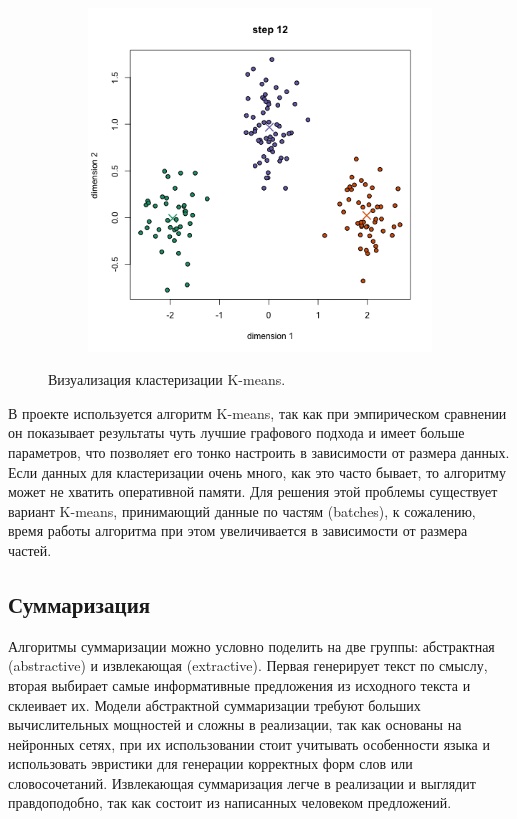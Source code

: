 \documentclass[a4paper, 14pt]{extarticle}
\begin{document}
\begin{figure}
\begin{subfigure}[b]{0.3\textwidth}
		\caption{}
	\end{subfigure}
	~ 
	\begin{subfigure}[b]{0.3\textwidth}
		\includegraphics[width=\textwidth]{k_5}
		\caption{}
	\end{subfigure}
	\caption{Визуализация кластеризации K-means.}
	\label{km}
\end{figure}

В проекте используется алгоритм K-means, так как при эмпирическом сравнении он показывает результаты чуть лучшие графового подхода и имеет больше параметров, что позволяет его тонко настроить в зависимости от размера данных. Если данных для кластеризации очень много, как это часто бывает, то алгоритму может не хватить оперативной памяти. Для решения этой проблемы существует вариант K-means, принимающий данные по частям (batches), к сожалению, время работы алгоритма при этом увеличивается в зависимости от размера частей.



\subsection{Суммаризация}
Алгоритмы суммаризации можно условно поделить на две группы: абстрактная (abstractive) и извлекающая (extractive). Первая генерирует текст по смыслу, вторая выбирает самые информативные предложения из исходного текста и склеивает их. Модели абстрактной суммаризации требуют больших вычислительных мощностей и сложны в реализации, так как основаны на нейронных сетях, при их использовании стоит учитывать особенности языка и использовать эвристики для генерации корректных форм слов или словосочетаний. Извлекающая суммаризация легче в реализации и выглядит правдоподобно, так как состоит из написанных человеком предложений.
\end{document}
